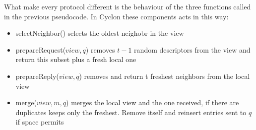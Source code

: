 \documentclass[a4paper,12pt,notitlepage]{article} %
\begin{document}
What make every protocol different is the behaviour of
 the three functions called in the previous pseudocode. In Cyclon these components acts
 in this way:

\begin{itemize}
	\item selectNeighbor() selects the oldest neighobr in the view
	\item prepareRequest(\(view, q\)) removes \(t-1\) random descriptors from the view and return this 
	subset plus a fresh local one
	\item prepareReply(\(view, q\)) removes and return t freshest neighbors from the local view
	\item merge(\(view, m, q\)) merges the local view and the one received, if there are duplicates keeps only the 
	freshest. Remove itself and reinsert entries sent to \(q\) if space permits
\end{itemize}
\end{document}

